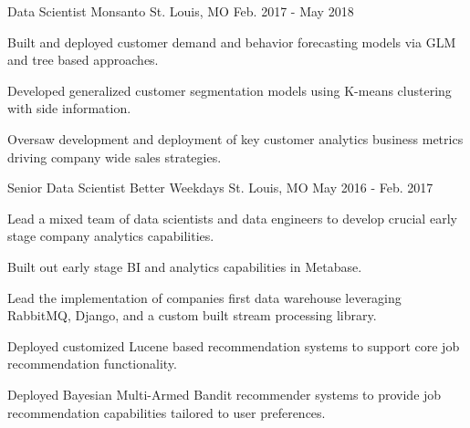 \begin{cventries}
  \cventry
    {Data Scientist} %
    {Monsanto} %
    {St. Louis, MO} %
    {Feb. 2017 - May 2018} %
    {
      \begin{cvitems} %
        \item {Built and deployed customer demand and behavior forecasting models via GLM and tree based approaches.}
        \item {Developed generalized customer segmentation models using K-means clustering with side information.}
        \item {Oversaw development and deployment of key customer analytics business metrics driving company wide sales strategies.}
      \end{cvitems}
    }

  \cventry
    {Senior Data Scientist} %
    {Better Weekdays} %
    {St. Louis, MO} %
    {May 2016 - Feb. 2017} %
    {
      \begin{cvitems} %
        \item {Lead a mixed team of data scientists and data engineers to develop crucial early stage company analytics capabilities.}
        \item {Built out early stage BI and analytics capabilities in Metabase.}
        \item {Lead the implementation of companies first data warehouse leveraging RabbitMQ, Django, and a custom built stream processing library.}
        \item {Deployed customized Lucene based recommendation systems to support core job recommendation functionality.}
        \item {Deployed Bayesian Multi-Armed Bandit recommender systems to provide job recommendation capabilities tailored to user preferences.}
      \end{cvitems}
    }


\end{cventries}
